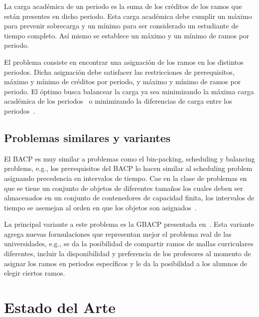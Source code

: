 \documentclass[letterpaper,10pt]{article}
\begin{document}
La carga académica de un periodo es la suma de los créditos de los ramos que están presentes en dicho periodo. Esta carga académica debe cumplir un máximo para prevenir sobrecarga y un mínimo para ser considerado un estudiante de tiempo completo. Así mismo se establece un máximo y un mínimo de ramos por periodo.

El problema consiste en encontrar una asignación de los ramos en los distintos periodos. Dicha asignación debe satisfacer las restricciones de prerequisitos, máximo y mínimo de créditos por periodo, y máximo y mínimo de ramos por periodo.
El óptimo busca balancear la carga ya sea minimizando la máxima carga académica de los periodos~\cite{DBLP:journals/corr/cs-PL-0110007} o minimizando la diferencias de carga entre los periodos~\cite{Monette07acp}.

\subsection{Problemas similares y variantes}

El BACP es muy similar a problemas como el bin-packing, scheduling y balancing problems, e.g., los prerequisitos del BACP lo hacen similar al scheduling problem asignando precedencia en intervalos de tiempo. Cae en la clase de problemas en que se tiene un conjunto de objetos de diferentes tamaños los cuales deben ser almacenados en un conjunto de contenedores de capacidad finita, los intervalos de tiempo se asemejan al orden en que los objetos son asignados~\cite{Monette07acp}.

La principal variante a este problema es la GBACP presentada en~\cite{GbacpGaspero}. Esta variante agrega nuevas formulaciones que representan mejor el problema real de las universidades, e.g., se da la posibilidad de compartir ramos de mallas curriculares diferentes, incluir la disponibilidad y preferencia de los profesores al momento de asignar los ramos en periodos específicos y le da la posibilidad a los alumnos de elegir ciertos ramos.






\section{Estado del Arte}

\end{document}
